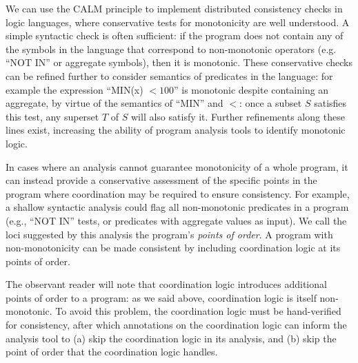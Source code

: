 We can use the CALM principle to implement distributed consistency checks in logic languages, where conservative tests for monotonicity are well understood. A simple syntactic check is often sufficient: if the program does not contain any of the symbols in the language that correspond to non-monotonic operators (e.g. ``NOT IN'' or aggregate symbols), then it is monotonic.  These conservative checks can be refined further to consider semantics of predicates in the language: for example the expression ``MIN(x) $< 100$'' is monotonic despite containing an aggregate, by virtue of the semantics of ``MIN'' and $<$: once a subset $S$ satisfies this test, any superset $T$ of $S$ will also satisfy it.  Further refinements along these lines exist, increasing the ability of program analysis tools to identify monotonic logic.
% 

In cases where an analysis cannot guarantee monotonicity of a whole program, it can instead provide a conservative assessment of the specific points in the program where coordination may be required to ensure consistency.  For example, a shallow syntactic analysis could flag all non-monotonic predicates in a program (e.g., ``NOT IN'' tests, or predicates with aggregate values as input).
We call the loci suggested by this analysis the program's \emph{points of
order}. A program with non-monotonicity can be made consistent by including coordination logic at its points of order.  

The observant reader will note that coordination logic introduces additional points of order to a program: as we said above, coordination logic is itself non-monotonic.  To avoid this problem, the coordination logic must be hand-verified for consistency, after which annotations on the coordination logic can inform the analysis tool to (a) skip the coordination logic in its analysis, and (b) skip the point of order that the coordination logic handles.  

